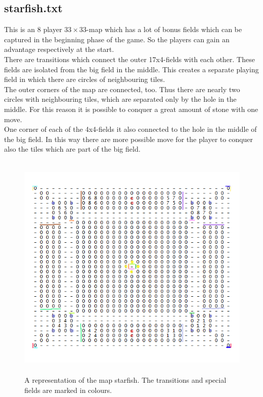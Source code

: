 \subsection{starfish.txt}
This is an 8 player $33\times33$-map which has a lot of bonus fields which can be captured in the beginning phase of the game. So the players can gain an advantage respectively at the start. \\
There are transitions which connect the outer 17x4-fields with each other. These fields are isolated from the big field in the middle. This creates a separate playing field in which there are circles of neighbouring tiles. \\  
The outer corners of the map are connected, too. Thus there are nearly two circles with neighbouring tiles, which are separated only by the hole in the middle. For this reason it is possible to conquer a great amount of stone with one move.\\
One corner of each of the 4x4-fields it also connected to the hole in the middle of the big field. In this way there are more possible move for the player to conquer also the tiles which are part of the big field.
\begin{figure}[H]
    \centering
    \includegraphics[height=11cm]{pictures/assignment1/starfish.PNG}
    \caption{A representation of the map starfish. The transitions and special fields are marked in colours.}
    \label{fig:starfish}
\end{figure}



